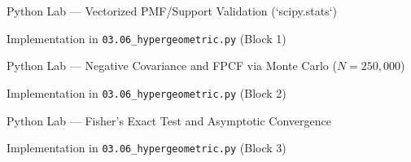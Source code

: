 \documentclass[aspectratio=169,xcolor={dvipsnames,table}]{beamer}
\begin{document}
\begin{frame}[fragile]{Python Lab --- Vectorized PMF/Support Validation (`scipy.stats`)}
	\vspace{-0.2cm}
	\begin{block}{Implementation in \texttt{03.06\_hypergeometric.py} (Block 1)}
		
	\end{block}
\end{frame}

\begin{frame}[fragile]{Python Lab --- Negative Covariance and FPCF via Monte Carlo ($N=250,000$)}
	\vspace{-0.25cm}
	\begin{block}{Implementation in \texttt{03.06\_hypergeometric.py} (Block 2)}
		
	\end{block}
\end{frame}

\begin{frame}[fragile]{Python Lab --- Fisher's Exact Test and Asymptotic Convergence}
	\vspace{-0.2cm}
	\begin{block}{Implementation in \texttt{03.06\_hypergeometric.py} (Block 3)}
		
	\end{block}
\end{frame}
\end{document}

